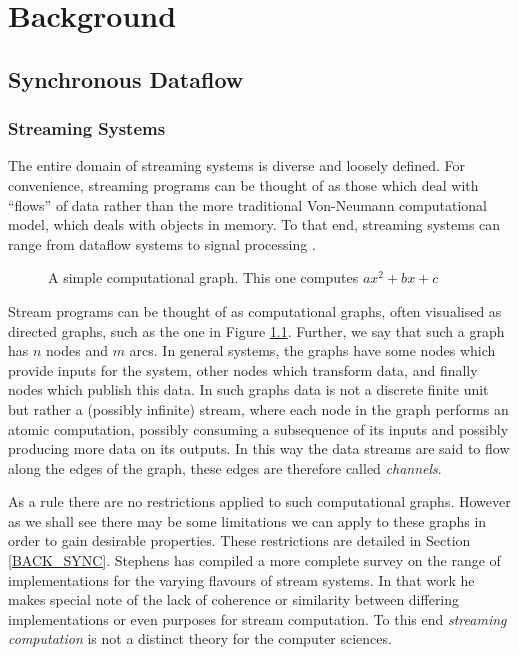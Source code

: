 \chapter{Background}
\label{chapBack}

\section{Synchronous Dataflow}

\subsection{Streaming Systems}
The entire domain of streaming systems is diverse and loosely defined.
For convenience, streaming programs can be thought of as those which deal with ``flows'' of data rather than the more traditional Von-Neumann computational model, which deals with objects in memory.
To that end, streaming systems can range from dataflow systems \cite{gur85} to signal processing \cite{sdfBook}.

\begin{figure}
\begin{center}
	
\caption{A simple computational graph.  This one computes $ax^2 + bx + c$}
\label{figSimpleDG}
\end{center}
\end{figure}

Stream programs can be thought of as computational graphs, often visualised as directed graphs, such as the one in Figure \ref{figSimpleDG}.
Further, we say that such a graph has $n$ nodes and $m$ arcs.
In general systems, the graphs have some nodes which provide inputs for the system, other nodes which transform data, and finally nodes which publish this data.
In such graphs data is not a discrete finite unit but rather a (possibly infinite) stream, where each node in the graph performs an atomic computation, possibly consuming a subsequence of its inputs and possibly producing more data on its outputs.
In this way the data streams are said to flow along the edges of the graph, these edges are therefore called {\em channels}.

As a rule there are no restrictions applied to such computational graphs.
However as we shall see there may be some limitations we can apply to these graphs in order to gain desirable properties.
These restrictions are detailed in Section \ref{BACK_SYNC}.
Stephens has compiled a more complete survey \cite{ste97} on the range of implementations for the varying flavours of stream systems.
In that work he makes special note of the lack of coherence or similarity between differing implementations or even purposes for stream computation.
To this end {\em streaming computation} is not a distinct theory for the computer sciences.


